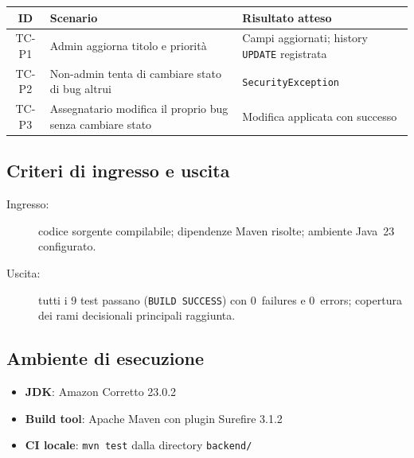 \begin{center}
\small
\begin{tabular}{|c|p{6cm}|p{5.5cm}|}
\hline
\textbf{ID} & \textbf{Scenario} & \textbf{Risultato atteso} \\
\hline
TC-P1 & Admin aggiorna titolo e priorità & Campi aggiornati; history \texttt{UPDATE} registrata \\
\hline
TC-P2 & Non-admin tenta di cambiare stato di bug altrui & \texttt{SecurityException} \\
\hline
TC-P3 & Assegnatario modifica il proprio bug senza cambiare stato & Modifica applicata con successo \\
\hline
\end{tabular}
\end{center}

\subsection{Criteri di ingresso e uscita}

\begin{description}
    \item[Ingresso:] codice sorgente compilabile; dipendenze Maven risolte;
    ambiente Java~23 configurato.
    \item[Uscita:] tutti i 9 test passano (\texttt{BUILD SUCCESS}) con
    0~failures e 0~errors; copertura dei rami decisionali principali
    raggiunta.
\end{description}

\subsection{Ambiente di esecuzione}

\begin{itemize}
    \item \textbf{JDK}: Amazon Corretto 23.0.2
    \item \textbf{Build tool}: Apache Maven con plugin Surefire 3.1.2
    \item \textbf{CI locale}: \texttt{mvn test} dalla directory \texttt{backend/}
\end{itemize}
